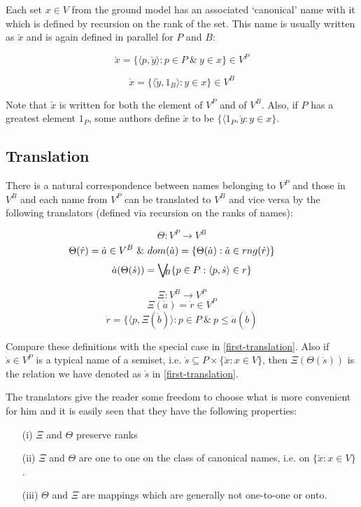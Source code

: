 Each set $x\in V$ from the ground model has an associated `canonical' name with it which is defined by recursion on the
rank of the set. This name is usually written as $\check{x}$ and is again defined in parallel for $P$ and $B$:
\begin{center}
\begin{minipage}{0.4\hsize}
$$
\check{x}=\{\langle p,\check{y}\rangle:p\in P\ \&\ y\in x\}\in V^P
$$
\end{minipage}
\begin{minipage}{0.4\hsize}
\vskip0.4cm
$$
\check{x}=\{\langle \check{y},1_B\rangle:y\in x\}\in V^B
$$
\end{minipage}
\end{center}
Note that $\check{x}$ is written for both the element of $V^P$ and of $V^B$. Also, if $P$ has a greatest element $1_P$,
some authors define $\check{x}$ to be $\{\langle 1_P,\check{y}:y\in x\}$.

\subsection{Translation}\label{lost-in-translation} There is a natural correspondence between names belonging to $V^P$ and those in $V^B$
and each name from $V^P$ can be translated to $V^B$ and vice versa by the following translators (defined via recursion
on the ranks of names):
\begin{center}
\begin{minipage}{0.4\hsize}
$$
\Theta:V^P\to V^B
$$
$$
\hskip-7mm\Theta(\dot{r})=\dot{a}\in V^B\ \&\ dom(\dot{a})=\{\Theta(\dot{a}):\dot{a}\in rng(\dot{r})\}
$$
$$
 \dot{a}(\Theta(\dot{s}))=\bigvee\hskip-0.2cm{}_B\{p\in P:\langle p,\dot{s}\rangle\in r\}
$$
\end{minipage}
\begin{minipage}{0.4\hsize}
$$
\Xi:V^B\to V^P
$$
$$
\Xi(\dot{a})=\dot{r}\in V^P
$$
$$
\dot{r}=\{\langle p,\Xi(\dot{b})\rangle:p\in P\ \&\ p\leq\dot{a}(\dot{b})
$$
\end{minipage}
\end{center}

Compare these definitions with the special case in \ref{first-translation}.
Also if $\dot{s}\in V^P$ is a typical name of a semiset, i.e. $\dot{s}\subseteq P\times\{\check{x}:x\in V\}$,
then $\Xi(\Theta(\dot{s}))$ is the relation we have denoted as $\mathring{s}$ in \ref{first-translation}.


The translators give the reader some freedom to choose what is more convenient for him
and it is easily seen that they have the following properties:
\begin{itemize}
 \item[(i)]  $\Xi$ and $\Theta$ preserve ranks
 \item[(ii)] $\Xi$ and $\Theta$ are one to one on the class of canonical names, i.e. on $\{\check{x}:x\in V\}$.
 \item[(iii)] $\Theta$ and $\Xi$ are mappings which are generally not one-to-one or onto.
\end{itemize}

